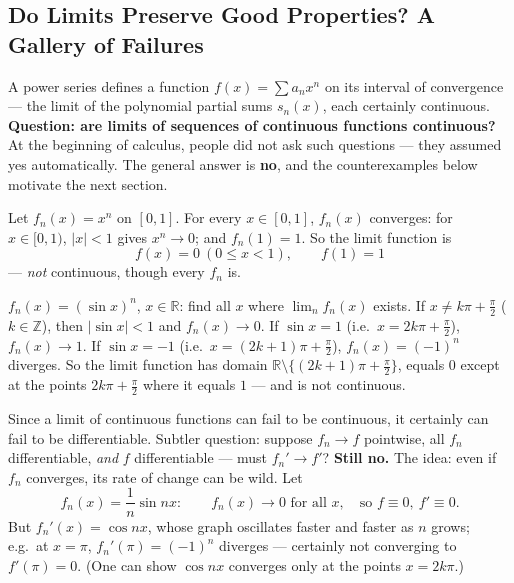 \documentclass[11pt]{report}
\begin{document}
\subsection{Do Limits Preserve Good Properties? A Gallery of Failures}

A power series defines a function $f(x) = \sum a_n x^n$ on its interval of convergence --- the limit of the polynomial partial sums $s_n(x)$, each certainly continuous. \textbf{Question: are limits of sequences of continuous functions continuous?} At the beginning of calculus, people did not ask such questions --- they assumed yes automatically. The general answer is \textbf{no}, and the counterexamples below motivate the next section.

\begin{exbox}
Let $f_n(x) = x^n$ on $[0,1]$. For every $x \in [0,1]$, $f_n(x)$ converges: for $x \in [0,1)$, $|x| < 1$ gives $x^n \to 0$; and $f_n(1) = 1$. So the limit function is
\[
f(x) = 0 \ (0 \leq x < 1), \qquad f(1) = 1
\]
--- \emph{not} continuous, though every $f_n$ is.
\end{exbox}

\begin{exbox}
$f_n(x) = (\sin x)^n$, $x \in \mathbb{R}$: find all $x$ where $\lim_n f_n(x)$ exists. If $x \neq k\pi + \tfrac\pi2$ ($k \in \mathbb{Z}$), then $|\sin x| < 1$ and $f_n(x) \to 0$. If $\sin x = 1$ (i.e.\ $x = 2k\pi + \tfrac\pi2$), $f_n(x) \to 1$. If $\sin x = -1$ (i.e.\ $x = (2k+1)\pi + \tfrac\pi2$), $f_n(x) = (-1)^n$ diverges. So the limit function has domain $\mathbb{R} \setminus \{(2k+1)\pi + \tfrac\pi2\}$, equals $0$ except at the points $2k\pi + \tfrac\pi2$ where it equals $1$ --- and is not continuous.
\end{exbox}

\begin{exbox}
Since a limit of continuous functions can fail to be continuous, it certainly can fail to be differentiable. Subtler question: suppose $f_n \to f$ pointwise, all $f_n$ differentiable, \emph{and} $f$ differentiable --- must $f_n' \to f'$? \textbf{Still no.} The idea: even if $f_n$ converges, its rate of change can be wild. Let
\[
f_n(x) = \frac1n \sin nx: \qquad f_n(x) \to 0 \text{ for all } x, \quad \text{so } f \equiv 0, \ f' \equiv 0.
\]
But $f_n'(x) = \cos nx$, whose graph oscillates faster and faster as $n$ grows; e.g.\ at $x = \pi$, $f_n'(\pi) = (-1)^n$ diverges --- certainly not converging to $f'(\pi) = 0$. (One can show $\cos nx$ converges only at the points $x = 2k\pi$.)
\end{exbox}
\end{document}

